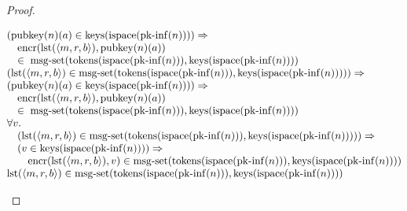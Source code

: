 \documentclass[11pt]{article}
\theoremstyle{plain}
\begin{document}
\begin{proof}
\begin{itemize}[leftmargin=2.8em, itemsep=4pt, parsep=1pt]
\begin{itemize}[leftmargin=2.8em, itemsep=4pt, parsep=1pt]
\begin{equation*}
\begin{array}{@{}l@{}}
\begin{array}{@{}l@{}} (\operatorname{pubkey}(n)(a) \in \operatorname{keys}(\operatorname{ispace}(\operatorname{pk\text{-}inf}(n)))) \Rightarrow  \\ \quad \operatorname{encr}(\operatorname{lst}(\langle m, r, b \rangle), \operatorname{pubkey}(n)(a)) \\ \quad \in\; \operatorname{msg\text{-}set}(\operatorname{tokens}(\operatorname{ispace}(\operatorname{pk\text{-}inf}(n))), \operatorname{keys}(\operatorname{ispace}(\operatorname{pk\text{-}inf}(n)))) \end{array} \\
\begin{array}{@{}l@{}} (\operatorname{lst}(\langle m, r, b \rangle) \in \operatorname{msg\text{-}set}(\operatorname{tokens}(\operatorname{ispace}(\operatorname{pk\text{-}inf}(n))), \operatorname{keys}(\operatorname{ispace}(\operatorname{pk\text{-}inf}(n))))) \Rightarrow  \\ (\operatorname{pubkey}(n)(a) \in \operatorname{keys}(\operatorname{ispace}(\operatorname{pk\text{-}inf}(n)))) \Rightarrow  \\ \quad \operatorname{encr}(\operatorname{lst}(\langle m, r, b \rangle), \operatorname{pubkey}(n)(a)) \\ \quad \in\; \operatorname{msg\text{-}set}(\operatorname{tokens}(\operatorname{ispace}(\operatorname{pk\text{-}inf}(n))), \operatorname{keys}(\operatorname{ispace}(\operatorname{pk\text{-}inf}(n)))) \end{array} \\
\begin{array}{@{}l@{}} \forall v. \\ \quad (\operatorname{lst}(\langle m, r, b \rangle) \in \operatorname{msg\text{-}set}(\operatorname{tokens}(\operatorname{ispace}(\operatorname{pk\text{-}inf}(n))), \operatorname{keys}(\operatorname{ispace}(\operatorname{pk\text{-}inf}(n))))) \Rightarrow  \\ \quad (v \in \operatorname{keys}(\operatorname{ispace}(\operatorname{pk\text{-}inf}(n)))) \Rightarrow  \\ \quad \quad \operatorname{encr}(\operatorname{lst}(\langle m, r, b \rangle), v) \in \operatorname{msg\text{-}set}(\operatorname{tokens}(\operatorname{ispace}(\operatorname{pk\text{-}inf}(n))), \operatorname{keys}(\operatorname{ispace}(\operatorname{pk\text{-}inf}(n)))) \end{array} \\
\operatorname{lst}(\langle m, r, b \rangle) \in \operatorname{msg\text{-}set}(\operatorname{tokens}(\operatorname{ispace}(\operatorname{pk\text{-}inf}(n))), \operatorname{keys}(\operatorname{ispace}(\operatorname{pk\text{-}inf}(n)))) \\

\end{array}
\end{equation*}
\end{itemize}
\end{itemize}
\end{proof}
\end{document}
